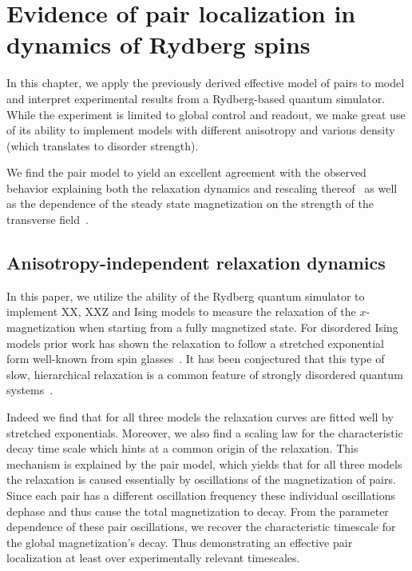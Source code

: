 \chapter{Evidence of pair localization in dynamics of Rydberg spins}\label{ch:experimental-pairs}

In this chapter, we apply the previously derived effective model of pairs to model and interpret experimental results from a Rydberg-based quantum simulator. While the experiment is limited to global control and readout, we make great use of its ability to implement models with different anisotropy and various density (which translates to disorder strength).

We find the pair model to yield  an excellent agreement with the observed behavior explaining both the relaxation dynamics and rescaling thereof~\cite{franzObservationAnisotropyindependentMagnetization2024} as well as the dependence of the steady state magnetization on the strength of the transverse field~\cite{franzEmergentPairLocalization2022}.


\section{Anisotropy-independent relaxation dynamics}
In this paper, we utilize the ability of the Rydberg quantum simulator to implement XX, XXZ and Ising models to measure the relaxation of the $x$-magnetization when starting from a fully magnetized state. For disordered Ising models prior work has shown the relaxation to follow a stretched exponential form well-known from spin glasses~\cite{breyStretchedExponentialDecay1993,signolesGlassyDynamicsDisordered2021,schultzenGlassyQuantumDynamics2022,schultzenSemiclassicalSimulationsPredict2022}. It has been conjectured that this type of slow, hierarchical relaxation is a common feature of strongly disordered quantum systems~\cite{haldarSlowDynamicsKohlrausch2023}.

Indeed we find that for all three models the relaxation curves are fitted well by stretched exponentials. Moreover, we also find a scaling law for the characteristic decay time scale which hints at a common origin of the relaxation. This mechanism is explained by the pair model, which yields that for all three models the relaxation is caused essentially by oscillations of the magnetization of pairs. Since each pair has a different oscillation frequency these individual oscillations dephase and thus cause the total magnetization to decay. From the parameter dependence of these pair oscillations, we recover the characteristic timescale for the global magnetization's decay. Thus demonstrating an effective pair localization at least over experimentally relevant timescales.

